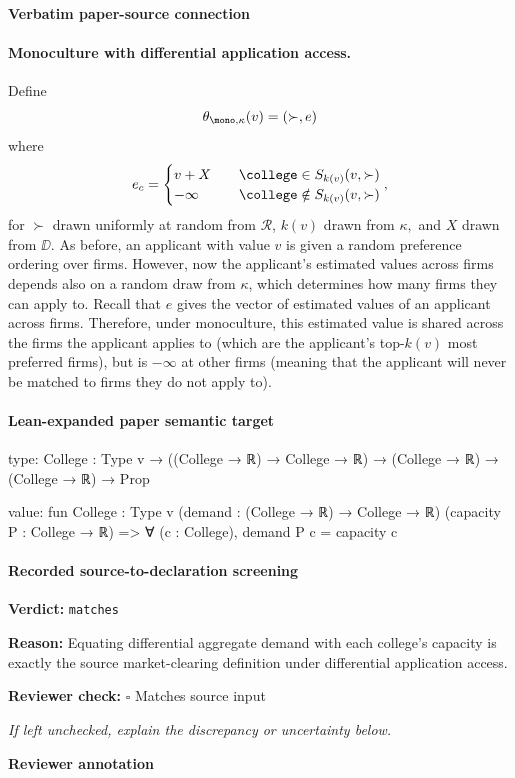\documentclass[10pt]{article}
\newcommand{\reviewerbox}{%
  \par\noindent\fbox{\parbox{0.96\linewidth}{\rule{0pt}{0.38in}}}\par
}
\newcommand{\reviewmatch}[1]{%
  \par\noindent\textbf{Reviewer check:} $\square$\; #1\par
  \noindent\emph{If left unchecked, explain the discrepancy or uncertainty below.}\par
}
\begin{document}
\paragraph{Verbatim paper-source connection}
\begin{ReviewVerbatim}
\paragraph{Monoculture with differential application access.} Define
\begin{equation}
    \theta_{\mono, \kappa}(v) = (\succ, e)
\end{equation}
where
\begin{equation}
    e_c =
    \begin{cases}
        v + X &\quad \college\in S_{k(v)}(v, \succ)\\
        -\infty &\quad \college\notin S_{k(v)}(v, \succ)
    \end{cases},
\end{equation}
for $\succ$ drawn uniformly at random from $\mathcal{R}$, $k(v)$ drawn from $\kappa,$ and $X$ drawn from $\DD$. As before, an applicant with value $v$ is given a random preference ordering over firms. However, now the applicant's estimated values across firms depends also on a random draw from $\kappa$, which determines how many firms they can apply to. Recall that $e$ gives the vector of estimated values of an applicant across firms. Therefore, under monoculture, this estimated value is shared across the firms the applicant applies to (which are the applicant's top-$k(v)$ most preferred firms), but is $-\infty$ at other firms (meaning that the applicant will never be matched to firms they do not apply to).
\end{ReviewVerbatim}



\paragraph{Lean-expanded paper semantic target}
\begin{ReviewVerbatim}
type:
{College : Type v} → ((College → ℝ) → College → ℝ) → (College → ℝ) → (College → ℝ) → Prop

value:
fun {College : Type v} (demand : (College → ℝ) → College → ℝ) (capacity P : College → ℝ) =>
  ∀ (c : College), demand P c = capacity c
\end{ReviewVerbatim}


\paragraph{Recorded source-to-declaration screening}
\textbf{Verdict:} \texttt{matches}
\\
{\raggedright
\textbf{Reason:} Equating differential aggregate demand with each college's capacity is exactly the source market-\allowbreak{}clearing definition under differential application access.\allowbreak{}
\par}
\reviewmatch{Matches source input}
\noindent\textbf{Reviewer annotation}\par
\reviewerbox
\clearpage
\hypertarget{paper-prerequisite-2ae75b2a98596b55}{}
\end{document}
